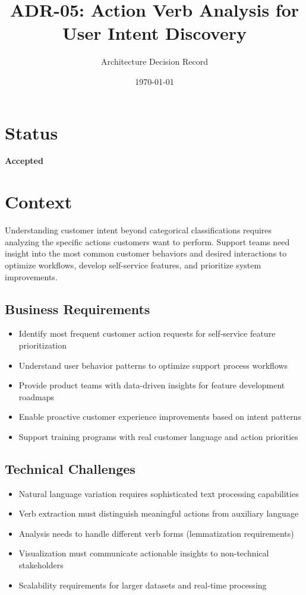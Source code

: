 \documentclass[11pt]{article}
\title{\textbf{ADR-05: Action Verb Analysis for User Intent Discovery}}
\author{Architecture Decision Record}
\date{\today}
\begin{document}
\maketitle

\section{Status}
\textbf{Accepted}

\section{Context}

Understanding customer intent beyond categorical classifications requires analyzing the specific actions customers want to perform. Support teams need insight into the most common customer behaviors and desired interactions to optimize workflows, develop self-service features, and prioritize system improvements.

\subsection{Business Requirements}
\begin{itemize}
\item Identify most frequent customer action requests for self-service feature prioritization
\item Understand user behavior patterns to optimize support process workflows
\item Provide product teams with data-driven insights for feature development roadmaps
\item Enable proactive customer experience improvements based on intent patterns
\item Support training programs with real customer language and action priorities
\end{itemize}

\subsection{Technical Challenges}
\begin{itemize}
\item Natural language variation requires sophisticated text processing capabilities
\item Verb extraction must distinguish meaningful actions from auxiliary language
\item Analysis needs to handle different verb forms (lemmatization requirements)
\item Visualization must communicate actionable insights to non-technical stakeholders
\item Scalability requirements for larger datasets and real-time processing
\end{itemize}
\end{document}
